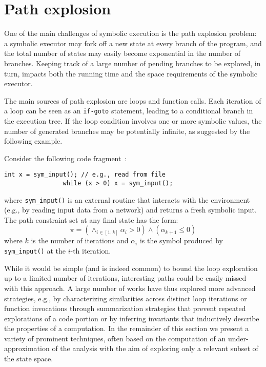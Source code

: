 
\section{Path explosion}
\label{se:path-explosion}

One of the main challenges of symbolic execution is the path explosion problem: a symbolic executor may fork off a new state at every branch of the program, and the total number of states may easily become exponential in the number of branches. Keeping track of a large number of pending branches to be explored, in turn, impacts both the running time and the space requirements of the symbolic executor. 

The main sources of path explosion are loops and function calls. Each iteration of a loop can be seen as an {\tt if-goto} statement, leading to a conditional branch in the execution tree. If the loop condition involves one or more symbolic values, the number of generated branches may be potentially infinite, as suggested by the following example. 

\vspace{-3pt} %
\begin{shaded} Consider the following code fragment~\cite{CS-CACM13}:
  \vspace{-1mm}
  \begin{lstlisting}[basicstyle=\ttfamily\small]
                int x = sym_input(); // e.g., read from file
                while (x > 0) x = sym_input();  
  \end{lstlisting}
  \vspace{-1mm}
\noindent where \texttt{sym\_input()} is an external routine that interacts with the environment (e.g., by reading input data from a network) and returns a fresh symbolic input. The path constraint set at any final state has the form:
\vspace{-1mm}
\[ \pi = \left( \wedge_{i \in [1, k]} \alpha_i > 0 \right) \wedge (\alpha_{k+1} \leq 0) \]
\noindent where $k$ is the number of iterations and $\alpha_i$ is the symbol produced by \texttt{sym\_input()} at the $i$-th iteration.
\end{shaded}
\vspace{-3pt} 

While it would be simple (and is indeed common) to bound the loop exploration up to a limited number of iterations, interesting paths could be easily missed with this approach.  A large number of works have thus explored more advanced strategies, e.g., by characterizing similarities across distinct loop iterations or function invocations through summarization strategies that prevent repeated explorations of a code portion or by inferring invariants that inductively describe the properties of a computation. In the remainder of this section we present a variety of prominent techniques, often based on the computation of an under-approximation of the analysis with the aim of exploring only a relevant subset of the state space.

